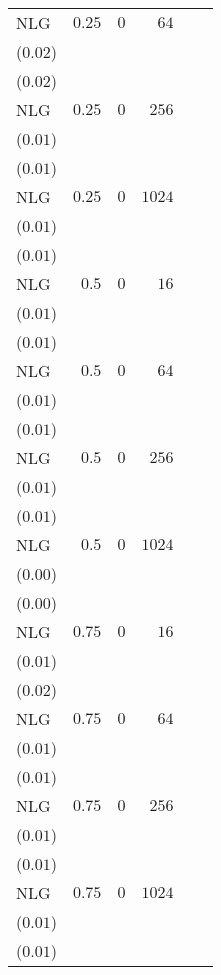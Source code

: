 \begin{table}[t]
\begin{tabular}{lrrrrr}
NLG & \(0.25\) & \(0\) & \(64\) & \longcell{\(0.25\)\\{\tiny(\(0.02\))}} & \longcell{\(0.25\)\\{\tiny(\(0.02\))}} \\[2.2ex]
NLG & \(0.25\) & \(0\) & \(256\) & \longcell{\(0.23\)\\{\tiny(\(0.01\))}} & \longcell{\(0.22\)\\{\tiny(\(0.01\))}} \\[2.2ex]
NLG & \(0.25\) & \(0\) & \(1024\) & \longcell{\(0.21\)\\{\tiny(\(0.01\))}} & \longcell{\(0.21\)\\{\tiny(\(0.01\))}} \\[2.2ex]
NLG & \(0.5\) & \(0\) & \(16\) & \longcell{\(0.24\)\\{\tiny(\(0.01\))}} & \longcell{\(0.24\)\\{\tiny(\(0.01\))}} \\[2.2ex]
NLG & \(0.5\) & \(0\) & \(64\) & \longcell{\(0.23\)\\{\tiny(\(0.01\))}} & \longcell{\(0.23\)\\{\tiny(\(0.01\))}} \\[2.2ex]
NLG & \(0.5\) & \(0\) & \(256\) & \longcell{\(0.22\)\\{\tiny(\(0.01\))}} & \longcell{\(0.22\)\\{\tiny(\(0.01\))}} \\[2.2ex]
NLG & \(0.5\) & \(0\) & \(1024\) & \longcell{\(0.20\)\\{\tiny(\(0.00\))}} & \longcell{\(0.20\)\\{\tiny(\(0.00\))}} \\[2.2ex]
NLG & \(0.75\) & \(0\) & \(16\) & \longcell{\(0.23\)\\{\tiny(\(0.01\))}} & \longcell{\(0.23\)\\{\tiny(\(0.02\))}} \\[2.2ex]
NLG & \(0.75\) & \(0\) & \(64\) & \longcell{\(0.22\)\\{\tiny(\(0.01\))}} & \longcell{\(0.22\)\\{\tiny(\(0.01\))}} \\[2.2ex]
NLG & \(0.75\) & \(0\) & \(256\) & \longcell{\(0.21\)\\{\tiny(\(0.01\))}} & \longcell{\(0.21\)\\{\tiny(\(0.01\))}} \\[2.2ex]
NLG & \(0.75\) & \(0\) & \(1024\) & \longcell{\(0.20\)\\{\tiny(\(0.01\))}} & \longcell{\(0.20\)\\{\tiny(\(0.01\))}} \\[2.2ex]

\end{tabular}
\end{table}
